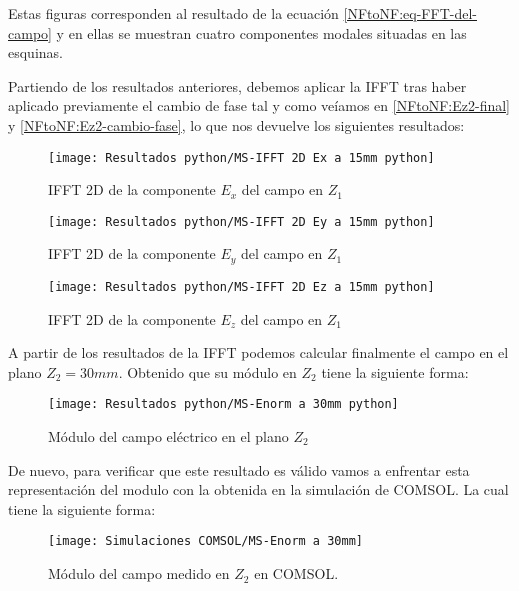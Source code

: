 Estas figuras corresponden al resultado de la ecuación \eqref{NFtoNF:eq-FFT-del-campo} y en ellas se muestran cuatro componentes modales situadas en las esquinas. 

\newpage

Partiendo de los resultados anteriores, debemos aplicar la IFFT tras haber aplicado previamente el cambio de fase tal y como veíamos en \eqref{NFtoNF:Ez2-final} y \eqref{NFtoNF:Ez2-cambio-fase}, lo que nos devuelve los siguientes resultados:

\begin{figure}[h] 
  \centering
    \texttt{[image: Resultados python/MS-IFFT 2D Ex a 15mm python]}
    \caption{IFFT 2D de la componente $E_x$ del campo en $Z_1$}
    \label{IFFT 2D Ex a 15mm}
\end{figure}

\begin{figure}[h] 
  \centering
    \texttt{[image: Resultados python/MS-IFFT 2D Ey a 15mm python]}
    \caption{IFFT 2D de la componente $E_y$ del campo en $Z_1$}
    \label{IFFT 2D Ex a 15mm}
\end{figure}
\newpage
\begin{figure}[h] 
  \centering
    \texttt{[image: Resultados python/MS-IFFT 2D Ez a 15mm python]}
    \caption{IFFT 2D de la componente $E_z$ del campo en $Z_1$}
    \label{IFFT 2D Ex a 15mm}
\end{figure}

\newpage

A partir de los resultados de la IFFT podemos calcular finalmente el campo en el plano $Z_2=30mm$. Obtenido que su módulo en $Z_2$ tiene la siguiente forma:

\begin{figure}[h] 
  \centering
    \texttt{[image: Resultados python/MS-Enorm a 30mm python]}
    \caption{Módulo del campo eléctrico en el plano $Z_2$}
    \label{IFFT 2D Ex a 15mm}
\end{figure}

De nuevo, para verificar que este resultado es válido vamos a enfrentar esta representación del modulo con la obtenida en la simulación de COMSOL. La cual tiene la siguiente forma:

\begin{figure}[h] 
  \centering
    \texttt{[image: Simulaciones COMSOL/MS-Enorm a 30mm]}
    \caption{Módulo del campo medido en $Z_2$ en COMSOL.}
    \label{IFFT 2D Ex a 15mm}
\end{figure}


